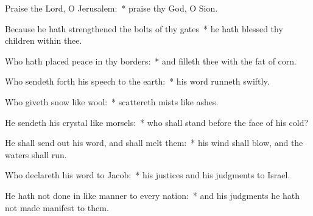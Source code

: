 \begin{enpars}
\item Praise the Lord, O Jerusalem:~* praise thy God, O Sion.
\item Because he hath strengthened the bolts of thy gates~* he hath blessed thy children within thee.
\item Who hath placed peace in thy borders:~* and filleth thee with the fat of corn.
\item Who sendeth forth his speech to the earth:~* his word runneth swiftly.
\item Who giveth snow like wool:~* scattereth mists like ashes.
\item He sendeth his crystal like morsels:~* who shall stand before the face of his cold?
\item He shall send out his word, and shall melt them:~* his wind shall blow, and the waters shall run.
\item Who declareth his word to Jacob:~* his justices and his judgments to Israel.
\item He hath not done in like manner to every nation:~* and his judgments he hath not made manifest to them.
\end{enpars}